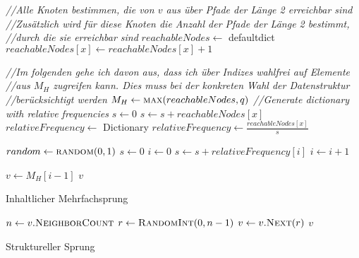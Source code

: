 \begin{algorithm}[H]
    \begin{algorithmic}[1]
            \State \textit{//Alle Knoten bestimmen, die von $v$ aus über Pfade der Länge 2 erreichbar sind}
            \State \textit{//Zusätzlich wird für diese Knoten die Anzahl der Pfade der Länge 2 bestimmt,}
            \State \textit{//durch die sie erreichbar sind}
            \State $reachableNodes \gets$ defaultdict
                    \State $reachableNodes[x] \gets reachableNodes[x] + 1$
                \EndFor
            \EndFor

            \State \textit{//Im folgenden gehe ich davon aus, dass ich über Indizes wahlfrei auf Elemente }
            \State \textit{//aus $M_H$ zugreifen kann. Dies muss bei der konkreten Wahl der Datenstruktur}
            \State \textit{//berücksichtigt werden}
            \State $M_H \gets \Call{max}{reachableNodes, q}$ 
            \State \textit{//Generate dictionary with relative frequencies}
            \State $s \gets 0$
                \State $s \gets s + reachableNodes[x]$
            \EndFor
            \State $relativeFrequency \gets $ Dictionary
                \State $relativeFrequency \gets \frac{reachableNodes[x]}{s}$
            \EndFor

            \State $random \gets \Call{random}{0, 1}$
            \State $s \gets 0$
            \State $i \gets 0$
                \State $s \gets s + relativeFrequency[i]$
                \State $i \gets i + 1$
            \EndWhile
            
            \State $v \gets M_H[i-1]$ 
            \State \Return $v$
        \EndProcedure
    \end{algorithmic}
\caption{Inhaltlicher Mehrfachsprung}
\label{alg:DYCOS-content-multihop}
\end{algorithm}

\begin{algorithm}[H]
    \begin{algorithmic}[1]
            \State $n \gets v.\Call{NeighborCount}{}$ 
            \State $r \gets \Call{RandomInt}{0, n-1}$ 
            \State $v \gets v.\Call{Next}{r}$ 
            \State \Return $v$
        \EndProcedure
    \end{algorithmic}
\caption{Struktureller Sprung}
\label{alg:DYCOS-structural-hop}
\end{algorithm}
